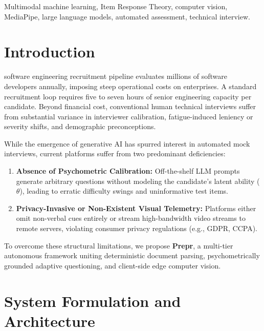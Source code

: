 \documentclass[journal,10pt,twocolumn]{IEEEtran}
\begin{document}
\begin{IEEEkeywords}
Multimodal machine learning, Item Response Theory, computer vision, MediaPipe, large language models, automated assessment, technical interview.
\end{IEEEkeywords}

\section{Introduction}
 software engineering recruitment pipeline evaluates millions of software developers annually, imposing steep operational costs on enterprises. A standard recruitment loop requires five to seven hours of senior engineering capacity per candidate. Beyond financial cost, conventional human technical interviews suffer from substantial variance in interviewer calibration, fatigue-induced leniency or severity shifts, and demographic preconceptions.

While the emergence of generative AI has spurred interest in automated mock interviews, current platforms suffer from two predominant deficiencies:
\begin{enumerate}
    \item \textbf{Absence of Psychometric Calibration:} Off-the-shelf LLM prompts generate arbitrary questions without modeling the candidate's latent ability ($\theta$), leading to erratic difficulty swings and uninformative test items.
    \item \textbf{Privacy-Invasive or Non-Existent Visual Telemetry:} Platforms either omit non-verbal cues entirely or stream high-bandwidth video streams to remote servers, violating consumer privacy regulations (e.g., GDPR, CCPA).
\end{enumerate}

To overcome these structural limitations, we propose \textbf{Prepr}, a multi-tier autonomous framework uniting deterministic document parsing, psychometrically grounded adaptive questioning, and client-side edge computer vision.

\section{System Formulation and Architecture}
\end{document}
